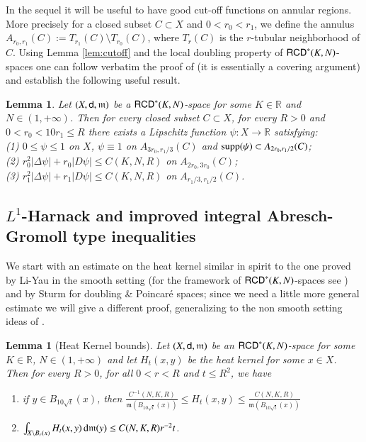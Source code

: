 \documentclass[11pt,reqno]{amsart}
\newcommand{\supp}{\mathop{\rm supp}\nolimits}
\newcommand{\mm}{\mathfrak m}
\newcommand{\sfd}{{\sf d}}
\renewcommand{\d}{{\rm{d}}}
\newcommand{\R}{\mathbb{R}}
\newcommand{\RCD}{{\sf RCD}}
\newtheorem{lemma}[theorem]{Lemma}
\theoremstyle{definition}
\theoremstyle{remark}
\theoremstyle{remark}
\theoremstyle{remark}
\theoremstyle{remark}
\theoremstyle{remark}
\theoremstyle{remark}
\theoremstyle{remark}
\begin{document}
In the sequel it will be useful to have good cut-off functions on annular regions. More precisely for a closed subset $C\subset X$ and $0<r_0<r_1$, we define the annulus $A_{r_0,r_1}(C):=T_{r_1}(C)\setminus T_{r_0}(C)$, where $T_r(C)$ is the $r$-tubular neighborhood of $C$. Using Lemma \ref{lem:cutoff} and the local doubling property of $\RCD^*(K,N)$-spaces one can follow verbatim the proof of \cite[Lemma 2.6]{CN} (it is essentially a covering argument) and establish the following useful result.

\begin{lemma}\label{lem:cutoffAnn}
Let $(X,\sfd,\mm)$ be a $\RCD^*(K,N)$-space for some $K \in \R$ and $N\in (1,+\infty)$. Then for every closed subset $C\subset X$, for every $R>0$ and $0<r_0<10 r_1\leq R$   there exists a Lipschitz function $\psi:X \to \R$ satisfying:
\\(1) $0\leq \psi \leq 1$ on $X$, $\psi \equiv 1$ on $A_{3r_0, r_1/3}(C)$ and $\supp (\psi) \subset A_{2r_0, r_1/2}(C)$;
\\(2) $r_0^2 |\Delta \psi|+r_0 |D \psi| \leq C(K,N,R)$ on $A_{2r_0,3r_0}(C)$;
\\(3) $r_1^2 |\Delta \psi|+r_1 |D \psi| \leq C(K,N,R)$ on $A_{r_1/3,r_1/2}(C)$. 
\end{lemma}
 
 \subsection{$L^1$-Harnack and improved integral Abresch-Gromoll type inequalities}
We start with an estimate on the heat kernel similar in spirit to the one proved by Li-Yau \cite{LY86} in the smooth setting (for the framework of $\RCD^*(K,N)$-spaces see \cite{GaMo}) and by Sturm \cite{Sturm96} for doubling \& Poincar\'e spaces; since we need a little more general estimate we will give a different proof, generalizing to the non smooth setting  ideas of \cite{CN}. 

\begin{lemma}[Heat Kernel bounds]\label{lem2.3}
Let $(X,\sfd,\mm)$ be an  $\RCD^*(K,N)$-space for some $K \in \R$, $N \in (1,+\infty)$ and let $H_t(x,y)$ be the heat kernel for some $x\in X$. Then for every $R>0$, for all $0<r<R$ and $t\leq R^2$, we have
\begin{enumerate}
\item if $y \in B_{10\sqrt{t}}(x)$, then $\frac{C^{-1}(N,K,R)}{\mm(B_{10\sqrt{t}}(x))} \leq H_t(x,y) \leq   \frac{C(N,K,R)}{\mm(B_{10\sqrt{t}}(x))}$
\item $\int_{X \setminus B_r(x)} H_t(x,y) \, \d\mm(y) \leq C(N,K,R) r^{-2} t$.
\end{enumerate}
\end{lemma}
\end{document}
